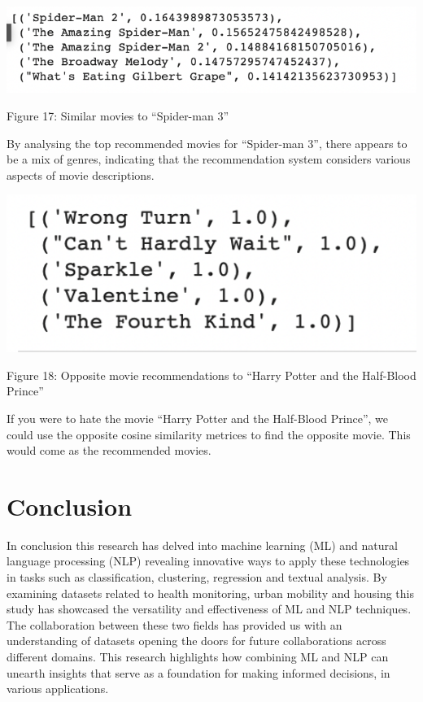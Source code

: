\documentclass{article}
\begin{document}
\begin{multicols}{2}
\includegraphics[scale=.5]{img/nlp5.png}

{\small
  Figure 17: Similar movies to “Spider-man 3”
  \par
  \vspace{6pt}
}

By analysing the top recommended movies for “Spider-man 3”, there appears to be a mix of genres, indicating that the recommendation system considers various aspects of movie descriptions.

\includegraphics[scale=.5]{img/nlp6.png}

{\small
  Figure 18: Opposite movie recommendations to “Harry Potter and the Half-Blood Prince”
  \par
  \vspace{6pt}
}

If you were to hate the movie “Harry Potter and the Half-Blood Prince”, we could use the opposite cosine similarity metrices to find the opposite movie. This would come as the recommended movies. 

\section{Conclusion}

In conclusion this research has delved into machine learning (ML) and natural language processing (NLP) revealing innovative ways to apply these technologies in tasks such as classification, clustering, regression and textual analysis. By examining datasets related to health monitoring, urban mobility and housing this study has showcased the versatility and effectiveness of ML and NLP techniques. The collaboration between these two fields has provided us with an understanding of datasets opening the doors for future collaborations across different domains. This research highlights how combining ML and NLP can unearth insights that serve as a foundation for making informed decisions, in various applications.

\end{multicols}







\end{document}
